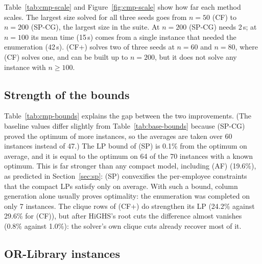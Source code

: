 Table~\ref{tab:cmp-scale} and Figure~\ref{fig:cmp-scale} show how far each
method scales. The largest size solved for all three seeds goes from $n=50$
(CF) to $n=200$ (SP-CG), the largest size in the suite. At $n=200$ (SP-CG)
needs 2\,s; at $n=100$ its mean time (15\,s) comes from a single instance
that needed the enumeration (42\,s). (CF+) solves two of three seeds at
$n=60$ and $n=80$, where (CF) solves one, and can be built up to $n=200$,
but it does not solve any instance with $n\ge100$.

\subsection{Strength of the bounds}

\begin{table}[ht]
\centering
\small
\caption{Bounds on the 60 transitive instances with a known optimum $z^*$:
mean LP gap and root gap (for (SP-CG): $z_{\mathrm{LP}}$ and
$\lceil 5z_{\mathrm{LP}}\rceil/5$), median nodes of the solved runs, solved
runs.}
\label{tab:cmp-bounds}

\end{table}

Table~\ref{tab:cmp-bounds} explains the gap between the two improvements.
(The baseline values differ slightly from Table~\ref{tab:base-bounds}
because (SP-CG) proved the optimum of more instances, so the averages are
taken over 60 instances instead of 47.)
The LP bound of (SP) is 0.1\% from the optimum on average, and it is equal
to the optimum on 64 of the 70 instances with a known optimum. This is far stronger than any
compact model, including (AF) (19.6\%), as predicted in Section~\ref{sec:sp}:
(SP) convexifies the per-employee constraints that the compact LPs satisfy
only on average. With such a bound, column generation alone usually proves
optimality: the enumeration was completed on only 7 instances. The clique rows
of (CF+) do strengthen its LP (24.2\% against 29.6\% for (CF)), but after
HiGHS's root cuts the difference almost vanishes (0.8\% against 1.0\%): the
solver's own clique cuts already recover most of it.

\subsection{OR-Library instances}

\begin{table}[ht]
\centering
\small
\setlength{\tabcolsep}{4pt}
\caption{OR-Library instances. Best baseline: (AF), the only exact baseline
model there. For (SP-CG): LP bound, final bound, best solution, total time
(TL: time limit), column generation time and number of enumerated columns
(--: enumeration not needed or abandoned).}
\label{tab:cmp-orlib}

\end{table}

